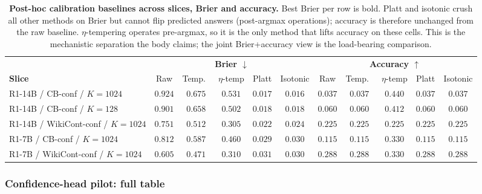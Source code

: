 \begin{table}[H]
\centering
\small
\caption{\textbf{Post-hoc calibration baselines across slices, Brier
and accuracy.}  Best Brier per row is bold.  Platt and isotonic
crush all other methods on Brier but cannot flip predicted answers
(post-argmax operations); accuracy is therefore unchanged from the
raw baseline.  $\eta$-tempering operates pre-argmax, so it is the
only method that lifts accuracy on these cells.  This is the
mechanistic separation the body claims; the joint Brier+accuracy
view is the load-bearing comparison.}
\label{tab:posthoc-cal-app}
\setlength{\tabcolsep}{1.5pt}
\scriptsize
\begin{tabular}{l|ccccc|ccccc}
\toprule
& \multicolumn{5}{c|}{\textbf{Brier $\downarrow$}} & \multicolumn{5}{c}{\textbf{Accuracy $\uparrow$}}\\
\textbf{Slice} & Raw & Temp.\ & $\eta$-temp & Platt & Isotonic & Raw & Temp.\ & $\eta$-temp & Platt & Isotonic\\
\midrule
R1-14B / CB-conf / $K{=}1024$    & $0.924$ & $0.675$ & $0.531$ & $\mathbf{0.017}$ & $0.016$ & $0.037$ & $0.037$ & $\mathbf{0.440}$ & $0.037$ & $0.037$\\
R1-14B / CB-conf / $K{=}128$     & $0.901$ & $0.658$ & $0.502$ & $\mathbf{0.018}$ & $0.018$ & $0.060$ & $0.060$ & $\mathbf{0.412}$ & $0.060$ & $0.060$\\
R1-14B / WikiCont-conf / $K{=}1024$ & $0.751$ & $0.512$ & $0.305$ & $\mathbf{0.022}$ & $0.024$ & $0.225$ & $0.225$ & $0.225$ & $0.225$ & $0.225$\\
R1-7B  / CB-conf / $K{=}1024$    & $0.812$ & $0.587$ & $0.460$ & $\mathbf{0.029}$ & $0.030$ & $0.115$ & $0.115$ & $\mathbf{0.330}$ & $0.115$ & $0.115$\\
R1-7B  / WikiCont-conf / $K{=}1024$ & $0.605$ & $0.471$ & $0.310$ & $\mathbf{0.031}$ & $0.030$ & $0.288$ & $0.288$ & $\mathbf{0.330}$ & $0.288$ & $0.288$\\
\bottomrule
\end{tabular}
\end{table}

\subsubsection{Confidence-head pilot: full table}

